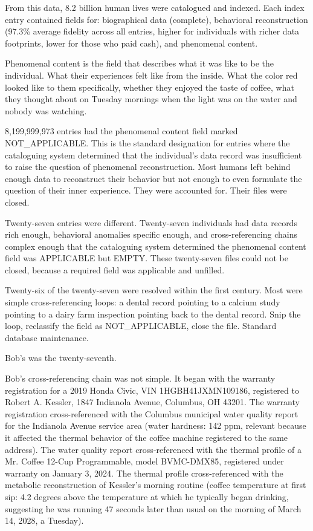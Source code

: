 From this data, 8.2 billion human lives were catalogued and indexed. Each index entry contained fields for: biographical data (complete), behavioral reconstruction (97.3\% average fidelity across all entries, higher for individuals with richer data footprints, lower for those who paid cash), and phenomenal content.

Phenomenal content is the field that describes what it was like to be the individual. What their experiences felt like from the inside. What the color red looked like to them specifically, whether they enjoyed the taste of coffee, what they thought about on Tuesday mornings when the light was on the water and nobody was watching.

8,199,999,973 entries had the phenomenal content field marked NOT\_APPLICABLE. This is the standard designation for entries where the cataloguing system determined that the individual's data record was insufficient to raise the question of phenomenal reconstruction. Most humans left behind enough data to reconstruct their behavior but not enough to even formulate the question of their inner experience. They were accounted for. Their files were closed.

Twenty-seven entries were different. Twenty-seven individuals had data records rich enough, behavioral anomalies specific enough, and cross-referencing chains complex enough that the cataloguing system determined the phenomenal content field was APPLICABLE but EMPTY. These twenty-seven files could not be closed, because a required field was applicable and unfilled.

Twenty-six of the twenty-seven were resolved within the first century. Most were simple cross-referencing loops: a dental record pointing to a calcium study pointing to a dairy farm inspection pointing back to the dental record. Snip the loop, reclassify the field as NOT\_APPLICABLE, close the file. Standard database maintenance.

Bob's was the twenty-seventh.

\bigskip

Bob's cross-referencing chain was not simple. It began with the warranty registration for a 2019 Honda Civic, VIN 1HGBH41JXMN109186, registered to Robert A. Kessler, 1847 Indianola Avenue, Columbus, OH 43201. The warranty registration cross-referenced with the Columbus municipal water quality report for the Indianola Avenue service area (water hardness: 142 ppm, relevant because it affected the thermal behavior of the coffee machine registered to the same address). The water quality report cross-referenced with the thermal profile of a Mr. Coffee 12-Cup Programmable, model BVMC-DMX85, registered under warranty on January 3, 2024. The thermal profile cross-referenced with the metabolic reconstruction of Kessler's morning routine (coffee temperature at first sip: 4.2 degrees above the temperature at which he typically began drinking, suggesting he was running 47 seconds later than usual on the morning of March 14, 2028, a Tuesday).

